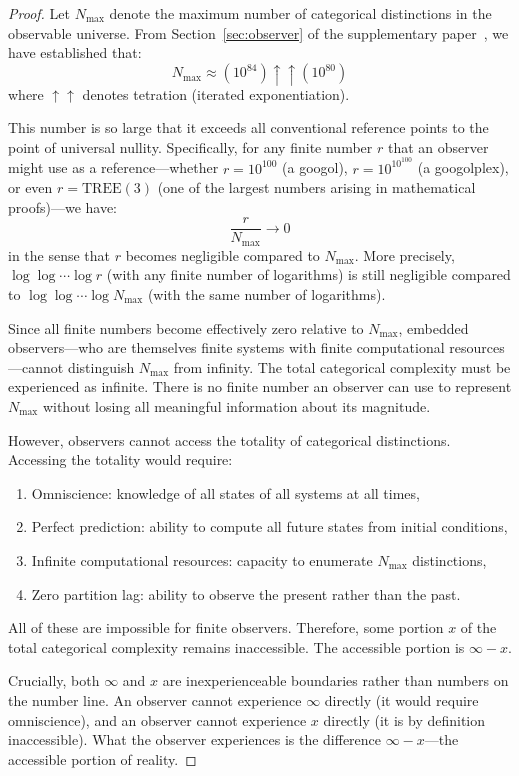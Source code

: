 \documentclass[12pt,a4paper]{article}
\theoremstyle{definition}
\theoremstyle{remark}
\newcommand{\Nmax}{N_{\text{max}}}
\begin{document}
\begin{proof}
Let $\Nmax$ denote the maximum number of categorical distinctions in the observable universe. From Section~\ref{sec:observer} of the supplementary paper~\citep{sachikonye2024observation}, we have established that:
\begin{equation}
\Nmax \approx (10^{84}) \uparrow\uparrow (10^{80})
\end{equation}
where $\uparrow\uparrow$ denotes tetration (iterated exponentiation).

This number is so large that it exceeds all conventional reference points to the point of universal nullity. Specifically, for any finite number $r$ that an observer might use as a reference—whether $r = 10^{100}$ (a googol), $r = 10^{10^{100}}$ (a googolplex), or even $r = \text{TREE}(3)$ (one of the largest numbers arising in mathematical proofs)—we have:
\begin{equation}
\frac{r}{\Nmax} \to 0
\end{equation}
in the sense that $r$ becomes negligible compared to $\Nmax$. More precisely, $\log \log \cdots \log r$ (with any finite number of logarithms) is still negligible compared to $\log \log \cdots \log \Nmax$ (with the same number of logarithms).

Since all finite numbers become effectively zero relative to $\Nmax$, embedded observers—who are themselves finite systems with finite computational resources—cannot distinguish $\Nmax$ from infinity. The total categorical complexity must be experienced as infinite. There is no finite number an observer can use to represent $\Nmax$ without losing all meaningful information about its magnitude.

However, observers cannot access the totality of categorical distinctions. Accessing the totality would require:
\begin{enumerate}
    \item Omniscience: knowledge of all states of all systems at all times,
    \item Perfect prediction: ability to compute all future states from initial conditions,
    \item Infinite computational resources: capacity to enumerate $\Nmax$ distinctions,
    \item Zero partition lag: ability to observe the present rather than the past.
\end{enumerate}

All of these are impossible for finite observers. Therefore, some portion $x$ of the total categorical complexity remains inaccessible. The accessible portion is $\infty - x$.

Crucially, both $\infty$ and $x$ are inexperienceable boundaries rather than numbers on the number line. An observer cannot experience $\infty$ directly (it would require omniscience), and an observer cannot experience $x$ directly (it is by definition inaccessible). What the observer experiences is the difference $\infty - x$—the accessible portion of reality.
\end{proof}
\end{document}
